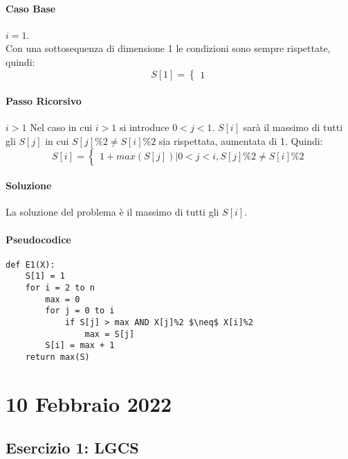 \documentclass[12pt, a4paper, openany]{book}
\begin{document}
\paragraph*{Caso Base} $i=1$.
\\Con una sottosequenza di dimensione 1 le condizioni sono sempre rispettate, quindi:
$$
	S[1]= \begin{cases}
		1
	\end{cases}
$$
\paragraph*{Passo Ricorsivo} $i>1$
Nel caso in cui $i>1$ si introduce $0<j<1$.
$S[i]$ sarà il massimo di tutti gli $S[j]$ in cui $S[j]\%2 \neq S[i]\%2$ sia rispettata, aumentata di 1.
Quindi:
$$
	S[i]= \begin{cases}
		1 + max(S[j]) | 0 < j < i, S[j]\%2 \neq S[i]\%2
	\end{cases}
$$
\paragraph*{Soluzione}
La soluzione del problema è il massimo di tutti gli $S[i]$.

\paragraph*{Pseudocodice}
\begin{lstlisting}[style=small]
def E1(X):
	S[1] = 1
	for i = 2 to n
		max = 0
		for j = 0 to i
			if S[j] > max AND X[j]%2 $\neq$ X[i]%2
				max = S[j]
		S[i] = max + 1
	return max(S) 
\end{lstlisting}

\section{10 Febbraio 2022}
\subsection{Esercizio 1: LGCS}
\end{document}
